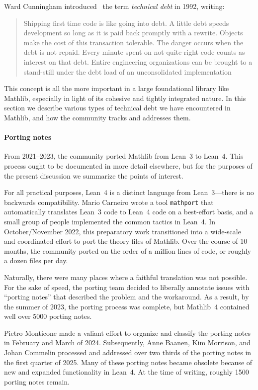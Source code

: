 \documentclass[runningheads]{llncs}
\def\mathlib{Mathlib\xspace}
\begin{document}
Ward Cunningham introduced~\cite{CunninghamTechDebt} the term \emph{technical debt} in 1992, writing:
\begin{quote}
	Shipping first time code is like going into debt.
	A little debt speeds development so long as it is paid back promptly with a rewrite.
	Objects make the cost of this transaction tolerable.
	The danger occurs when the debt is not repaid.
	Every minute spent on not-quite-right code counts as interest on that debt.
	Entire engineering organizations can be brought to a stand-still under the debt load of an unconsolidated implementation
\end{quote}
This concept is all the more important in a large foundational library like \mathlib,
especially in light of its cohesive and tightly integrated nature.
In this section we describe various types of technical debt we have encountered in \mathlib,
and how the community tracks and addresses them.

\paragraph{Porting notes}
From 2021--2023, the community ported \mathlib from Lean~3 to Lean~4.
This process ought to be documented in more detail elsewhere,
but for the purposes of the present discussion we summarize the points of interest.

For all practical purposes, Lean~4 is a distinct language from Lean~3---there is no backwards compatibility.
Mario Carneiro wrote a tool \texttt{mathport} that automatically translates Lean~3 code to Lean~4 code on a best-effort basis,
and a small group of people implemented the common tactics in Lean~4.
In October/November 2022,
this preparatory work transitioned into a wide-scale and coordinated effort to port the theory files of \mathlib.
Over the course of 10 months, the community ported on the order of a million lines of code, or roughly a dozen files per day.

Naturally, there were many places where a faithful translation was not possible.
For the sake of speed, the porting team decided to liberally annotate issues with ``porting notes'' that described the problem and the workaround.
As a result, by the summer of 2023, the porting process was complete,
but \mathlib~4 contained well over 5000 porting notes.

Pietro Monticone made a valiant effort to organize and classify the porting notes in February and March of 2024.
Subsequently, Anne Baanen, Kim Morrison, and Johan Commelin processed and addressed over two thirds of the porting notes in the first quarter of 2025.
Many of these porting notes became obsolete because of new and expanded functionality in Lean~4.
At the time of writing, roughly 1500 porting notes remain.
\end{document}
